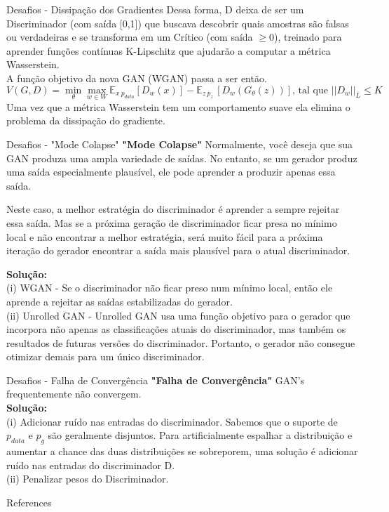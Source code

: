 \documentclass[10pt]{beamer}
\begin{document}
\begin{frame}[fragile]{Desafios - Dissipação dos Gradientes}
  \small
  Dessa forma, D deixa de ser um Discriminador (com saída [0,1]) que buscava descobrir quais amostras são falsas ou verdadeiras e se transforma em um Crítico (com saída $\geq0$), treinado para aprender funções contínuas K-Lipschitz que ajudarão a computar a métrica Wasserstein. \\
  A função objetivo da nova GAN (WGAN) passa a ser então.
  $$V(G,D) = \min_{\theta} \max_{w \in W} \mathbb{E}_{x~p_{data}}[D_w(x)] - \mathbb{E}_{z~p_z~}[D_w(G_{\theta}(z))] \text{, tal que } ||D_w||_L \leq K$$
  Uma vez que a métrica Wasserstein tem um comportamento suave ela elimina o problema da dissipação do gradiente.
\end{frame}

\begin{frame}[fragile]{Desafios - "Mode Colapse"}
  \small
  \textbf{"Mode Colapse"}
  Normalmente, você deseja que sua GAN produza uma ampla variedade de saídas. No entanto, se um gerador produz uma saída especialmente plausível, ele pode aprender a produzir apenas essa saída.

  Neste caso, a melhor estratégia do discriminador é aprender a sempre rejeitar essa saída. Mas se a próxima geração de discriminador ficar presa no mínimo local e não encontrar a melhor estratégia, será muito fácil para a próxima iteração do gerador encontrar a saída mais plausível para o atual discriminador.

  \textbf{Solução:}\\
  (i) WGAN - Se o discriminador não ficar preso num mínimo local, então ele aprende a rejeitar as saídas estabilizadas do gerador.\\
  (ii) Unrolled GAN - Unrolled GAN usa uma função objetivo para o gerador que incorpora não apenas as classificações atuais do discriminador, mas também os resultados de futuras versões do discriminador. Portanto, o gerador não consegue otimizar demais para um único discriminador.
 \end{frame}

\begin{frame}[fragile]{Desafios - Falha de Convergência}
  \small
  \textbf{"Falha de Convergência"}
  GAN's frequentemente não convergem.\\
  \textbf{Solução:}\\
  (i) Adicionar ruído nas entradas do discriminador. Sabemos que o suporte de $p_{data}$ e $p_g$ são geralmente disjuntos. Para artificialmente espalhar a distribuição e aumentar a chance das duas distribuições se sobreporem, uma solução é adicionar ruído nas entradas do discriminador D.\\
  (ii) Penalizar pesos do Discriminador.
 \end{frame}

\begin{frame}[allowframebreaks]{References}

  \renewcommand{\section}[2]{}%
  
  

\end{frame}
\end{document}
